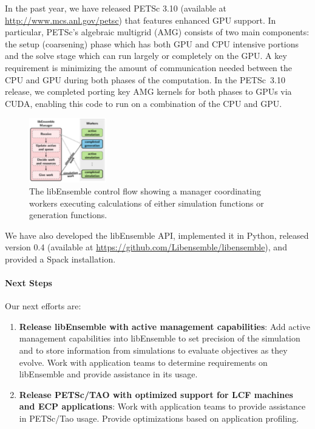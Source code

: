 In the past year, we have released PETSc 3.10 (available at \url{http://www.mcs.anl.gov/petsc})
that features enhanced GPU support.  In particular, PETSc’s algebraic multigrid (AMG) consists 
of two main components: the setup (coarsening) phase which has both GPU and CPU intensive 
portions and the solve stage which can run largely or completely on the GPU. A key 
requirement is minimizing the amount of communication needed between the CPU 
and GPU during both phases of the computation.  In the PETSc~3.10 release, we 
completed porting key AMG kernels for both phases to GPUs via CUDA, enabling
this code to run on a combination of the CPU and GPU.

\begin{figure}
\centering
\includegraphics[width=0.3\textwidth]{projects/2.3.3-MathLibs/2.3.3.06-PETSc-TAO/lib_ensemble}
\caption{The libEnsemble control flow showing a manager coordinating workers executing 
calculations of either simulation functions or generation functions.}
\label{fig:petsc-tao-fig}
\end{figure}

We have also developed the libEnsemble API, implemented it in Python, released 
version 0.4 (available at \url{https://github.com/Libensemble/libensemble}),
and provided a Spack installation.

\paragraph{Next Steps}

Our next efforts are:
\begin{enumerate}
  \item \textbf{Release libEnsemble with active management capabilities}: Add active management 
    capabilities into libEnsemble to set precision of the simulation and to store information 
    from simulations to evaluate objectives as they evolve. Work with application teams to 
    determine requirements on libEnsemble and provide assistance in its usage.
  \item \textbf{Release PETSc/TAO with optimized support for LCF machines and ECP applications}:
    Work with application teams to provide assistance in PETSc/Tao usage. Provide optimizations 
    based on application profiling.
\end{enumerate}

